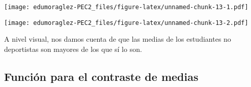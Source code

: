 \documentclass[
]{article}
\newenvironment{Shaded}{\begin{snugshade}}{\end{snugshade}}
\newcommand{\AttributeTok}[1]{\textcolor[rgb]{0.80,0.80,0.80}{#1}}
\newcommand{\FunctionTok}[1]{\textcolor[rgb]{0.94,0.94,0.56}{#1}}
\newcommand{\NormalTok}[1]{\textcolor[rgb]{0.80,0.80,0.80}{#1}}
\newcommand{\OtherTok}[1]{\textcolor[rgb]{0.94,0.94,0.56}{#1}}
\newcommand{\SpecialCharTok}[1]{\textcolor[rgb]{0.86,0.64,0.64}{#1}}
\newcommand{\StringTok}[1]{\textcolor[rgb]{0.80,0.58,0.58}{#1}}
\begin{document}
\texttt{[image: edumoraglez-PEC2\_files/figure-latex/unnamed-chunk-13-1.pdf]}

\begin{Shaded}
\end{Shaded}

\texttt{[image: edumoraglez-PEC2\_files/figure-latex/unnamed-chunk-13-2.pdf]}

A nivel visual, nos damos cuenta de que las medias de los estudiantes no
deportistas son mayores de los que sí lo son.

\hypertarget{funciuxf3n-para-el-contraste-de-medias}{%
\subsection{Función para el contraste de
medias}\label{funciuxf3n-para-el-contraste-de-medias}}
\end{document}

